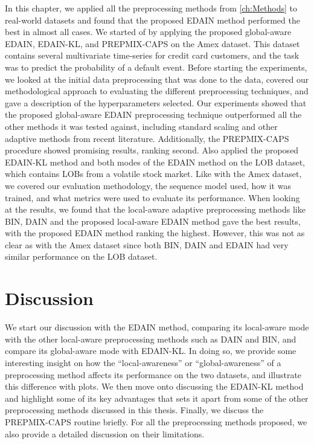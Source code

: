 \documentclass{statsmsc}
\begin{document}
{In this chapter, we applied all the preprocessing methods from \cref{ch:Methods} to real-world
datasets and found that the proposed \ac{EDAIN} method performed the best in almost all cases.
We started of by applying the proposed global-aware \ac{EDAIN}, \ac{EDAIN-KL}, and
\ac{PREPMIX-CAPS} on the Amex dataset.  This dataset contains several
multivariate time-series for credit card customers, and the task was to predict
the probability of a default event.  Before starting the experiments, we looked
at the initial data preprocessing that was done to the data, covered our
methodological approach to evaluating the different preprocessing techniques,
and gave a description of the hyperparameters selected.  Our experiments
showed that the proposed global-aware \ac{EDAIN} preprocessing technique
outperformed all the other methods it was tested against, including standard
scaling and other adaptive methods from recent literature.  Additionally, the
\ac{PREPMIX-CAPS} procedure showed promising results, ranking second.
Also applied the proposed \ac{EDAIN-KL} method and both modes of the \ac{EDAIN} method
on the \ac{LOB} dataset, which
contains \acp{LOB} from a volatile stock market.
Like with the Amex dataset, we covered our evaluation methodology, the sequence model used,
how it was trained, and what metrics were used to evaluate its performance.
When looking at the results, we found that the local-aware adaptive preprocessing methods like
\ac{BIN}, \ac{DAIN} and the proposed local-aware \ac{EDAIN} method gave the best results, with the
proposed \ac{EDAIN} method ranking the highest. However, this was not as clear as with the Amex
dataset since both \ac{BIN}, \ac{DAIN} and \ac{EDAIN} had very similar performance on the
\ac{LOB} dataset.



\chapter{Discussion} %
\label{ch:Discussion}


We start our discussion with the \ac{EDAIN} method, comparing its local-aware mode
with the other local-aware preprocessing methods such as
\ac{DAIN} and \ac{BIN}, and compare its global-aware mode with \ac{EDAIN-KL}.
In doing so, we provide some
interesting insight on how the ``local-awareness'' or ``global-awareness'' of a preprocessing method
affects its performance on the two datasets, and illustrate this difference with plots. We then move onto discussing the \ac{EDAIN-KL} method and highlight some of its key advantages
that sets it apart from some of the other preprocessing methods discussed in this thesis. Finally,
we discuss the \ac{PREPMIX-CAPS} routine briefly. For all the preprocessing methods proposed,
we also provide a detailed discussion on their limitations.

}
\end{document}
